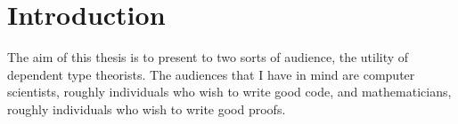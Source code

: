 \section{Introduction}









The aim of this thesis is to present to two sorts of audience, the utility of dependent type theorists. The audiences that I have in mind are computer scientists, roughly individuals who wish to write good code, and mathematicians, roughly individuals who wish to write good proofs.

